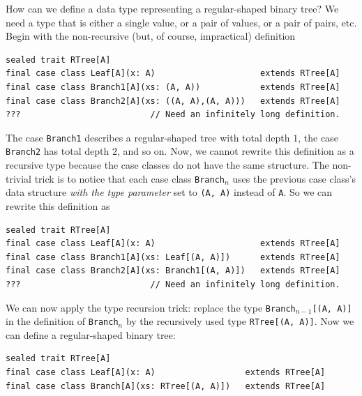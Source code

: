 How can we define a data type representing a regular-shaped binary
tree? We need a type that is either a single value, or a pair of values,
or a pair of pairs, etc. Begin with the non-recursive (but, of course,
impractical) definition
\begin{lstlisting}
sealed trait RTree[A]
final case class Leaf[A](x: A)                     extends RTree[A]
final case class Branch1[A](xs: (A, A))            extends RTree[A]
final case class Branch2[A](xs: ((A, A),(A, A)))   extends RTree[A]
???                          // Need an infinitely long definition.
\end{lstlisting}
The case \lstinline!Branch1! describes a regular-shaped tree with
total depth $1$, the case \lstinline!Branch2! has total depth $2$,
and so on. Now, we cannot rewrite this definition as a recursive type
because the case classes do not have the same structure. The non-trivial
trick is to notice that each case class \lstinline!Branch!$_{n}$
uses the previous case class\textsf{'}s data structure \emph{with the type
parameter} set to \lstinline!(A, A)! instead of \lstinline!A!. So
we can rewrite this definition as
\begin{lstlisting}
sealed trait RTree[A]
final case class Leaf[A](x: A)                     extends RTree[A]
final case class Branch1[A](xs: Leaf[(A, A)])      extends RTree[A]
final case class Branch2[A](xs: Branch1[(A, A)])   extends RTree[A]
???                          // Need an infinitely long definition.
\end{lstlisting}
We can now apply the type recursion trick: replace the type \lstinline!Branch!$_{n-1}$\lstinline![(A, A)]!
in the definition of \lstinline!Branch!$_{n}$ by the recursively
used type \lstinline!RTree[(A, A)]!. Now we can define a regular-shaped
binary tree:
\begin{lstlisting}
sealed trait RTree[A]
final case class Leaf[A](x: A)                  extends RTree[A]
final case class Branch[A](xs: RTree[(A, A)])   extends RTree[A]
\end{lstlisting}


